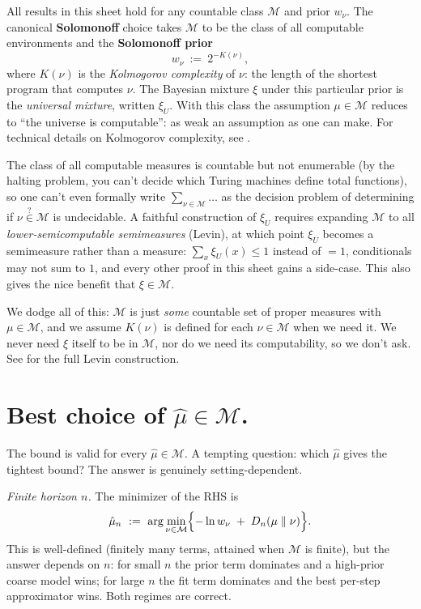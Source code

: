 \documentclass[fontsize=11pt, parskip=half]{scrartcl}
\newcommand{\Mc}{\mathcal{M}}
\begin{document}
All results in this sheet hold for any countable class $\Mc$ and prior $w_\nu$. The canonical \textbf{Solomonoff} choice takes $\Mc$ to be the class of all computable environments and the \textbf{Solomonoff prior}
\[
w_\nu ~:=~ 2^{-K(\nu)},
\]
where $K(\nu)$ is the \emph{Kolmogorov complexity} of $\nu$: the length of the shortest program that computes $\nu$. The Bayesian mixture $\xi$ under this particular prior is the \emph{universal mixture}, written $\xi_U$. With this class the assumption $\mu \in \Mc$ reduces to ``the universe is computable'': as weak an assumption as one can make. For technical details on Kolmogorov complexity, see \cite[\S2.7]{Hutter:24uaibook2}.

The class of all computable measures is countable but not enumerable (by the halting problem, you can't decide which Turing machines define total functions), so one can't even formally write
$\sum_{\nu \in \Mc} \ldots$ as the decision problem of determining if $\nu \overset{?}{\in} \Mc$ is undecidable. A faithful construction of $\xi_U$ requires expanding $\Mc$ to all \emph{lower-semicomputable semimeasures} (Levin), at which point $\xi_U$ becomes a semimeasure rather than a measure: $\sum_x \xi_U(x) \leq 1$ instead of $=1$, conditionals may not sum to $1$, and every other proof in this sheet gains a side-case. This also gives the nice benefit that $\xi \in \mathcal{M}$.

We dodge all of this: $\Mc$ is just \emph{some} countable set of proper measures with $\mu \in \Mc$, and we assume $K(\nu)$ is defined for each $\nu \in \Mc$ when we need it. We never need $\xi$ itself to be in $\Mc$, nor do we need its computability, so we don't ask. See \cite[\S2.4.3]{Hutter:04uaibook} for the full Levin construction.


\section{Best choice of $\hat{\mu} \in \Mc$.}\label{app:best_choice_mu}

The bound is valid for every $\hat\mu \in \Mc$. A tempting question: which
$\hat\mu$ gives the tightest bound? The answer is genuinely setting-dependent.

\textit{Finite horizon $n$.} The minimizer of the RHS is
\[
    \hat\mu_n ~:=~ \arg\min_{\nu \in \Mc}\Bigl\{ -\ln w_\nu \;+\; D_n(\mu \parallel \nu) \Bigr\}.
\]
This is well-defined (finitely many terms, attained when $\Mc$ is finite),
but the answer depends on $n$: for small $n$ the prior term dominates and a
high-prior coarse model wins; for large $n$ the fit term dominates and the best
per-step approximator wins. Both regimes are correct.
\end{document}
